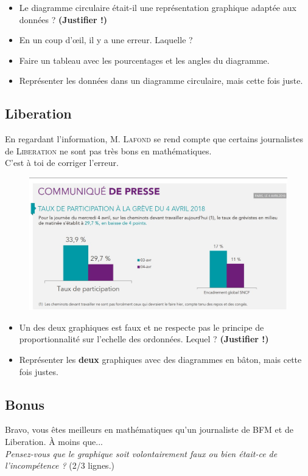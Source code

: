 \documentclass[12pt]{article}
\begin{document}
\begin{itemize}
	\item[1.] Le diagramme circulaire était-il une représentation graphique adaptée aux données ? \textbf{(Justifier !)}
	\item[2.] En un coup d'œil, il y a une erreur. Laquelle ?
	\item[3.] Faire un tableau avec les pourcentages et les angles du diagramme.
	\item[4.] Représenter les données dans un diagramme circulaire, mais cette fois juste.
\end{itemize}	

\subsection*{Liberation}

\begin{multicols}{2}

En regardant l'information, \textsc{M. Lafond} se rend compte que certains journalistes de \textsc{Liberation} ne sont pas très bons en mathématiques.\\
C'est à toi de corriger l'erreur. 

\begin{figure}[H]
	\centering
	\includegraphics[width=\linewidth]{3x1-statistiques/sources/liberation.jpg}
\end{figure}

\end{multicols}

\begin{itemize}
	\item[1.] Un des deux graphiques est faux et ne respecte pas le principe de proportionnalité sur l'echelle des ordonnées. Lequel ? \textbf{(Justifier !)}
	\item[2.] Représenter les \textbf{deux} graphiques avec des diagrammes en bâton, mais cette fois justes.
\end{itemize}	

\subsection*{Bonus}

Bravo, vous êtes meilleurs en mathématiques qu'un journaliste de BFM et de Liberation. À moins que... \\
\textit{Pensez-vous que le graphique soit volontairement faux ou bien était-ce de l'incompétence ?} (2/3 lignes.)
\end{document}
